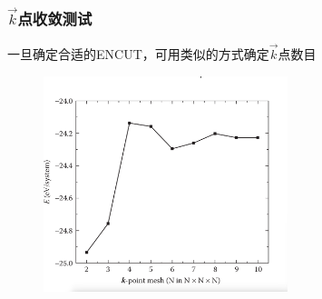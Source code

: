 \frame
{
	\frametitle{$\vec k$点收敛测试}
一旦确定合适的\textrm{ENCUT}，可用类似的方式确定$\vec k$点数目%
%
\begin{figure}[h!]
\centering
\includegraphics[width=2.8in,viewport=0 11 820 650,clip]{Figures/Pt_FCC-kpoint-convergence.png}
\caption{\fontsize{6.2pt}{5.2pt}}%
\label{Pt_FCC-kpoint-curve}
\end{figure}
{\fontsize{6.2pt}{5.2pt}}%
}

